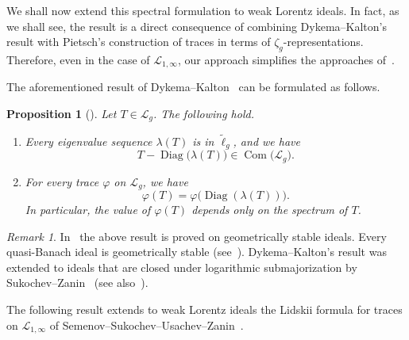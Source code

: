 \documentclass[10pt, a4paper]{amsart}
\newcommand{\sL}{\mathscr{L}}
\newcommand{\op}{\operatorname}
\newcommand{\Com}{\op{Com}}
\numberwithin{equation}{section}
\newtheorem{proposition}[theorem]{Proposition}
\theoremstyle{definition}
\theoremstyle{remark}
\newtheorem{remark}[theorem]{Remark}
\newcommand{\Diag}{\op{Diag}}
\begin{document}
We shall now extend this spectral formulation to weak Lorentz ideals. In fact, as we shall see, the result is a direct consequence of combining Dykema--Kalton's result with Pietsch's construction of traces in terms of $\zeta_g$-representations. Therefore, even in the case of $\sL_{1,\infty}$, our approach simplifies the approaches of~\cite{LSZ:Book, SSUZ:AIM15}.
 
 The aforementioned result of Dykema--Kalton~\cite{DK:Crelle98} can be formulated as follows.

\begin{proposition}[\cite{DK:Crelle98}] \label{prop:DK}
Let $T\in \sL_g$. The following hold. 
\begin{enumerate}
 \item Every eigenvalue sequence $\lambda(T)$ is in $\tilde{\ell}_g$, and we have
 \begin{equation*}
 T- \Diag\big(\lambda(T)\big)\in \Com\big(\sL_g\big). 
\end{equation*}

\item For every trace $\varphi$ on $\sL_g$, we have
\begin{equation*}
 \varphi(T)=\varphi\big(\Diag( \lambda(T))\big).
\end{equation*}
In particular, the value of $\varphi(T)$ depends only on the spectrum of $T$.
\end{enumerate}
\end{proposition}

\begin{remark}
In~\cite{DK:Crelle98} the above result is proved on geometrically stable ideals. Every quasi-Banach ideal is geometrically stable (see~\cite{Ka:Crelle98}). Dykema--Kalton's result was extended to ideals that are closed under logarithmic submajorization by Sukochev--Zanin~\cite{SZ:AIM14} (see also~\cite[Chapter~5]{LSZ:Book}).
\end{remark}

The following result extends to weak Lorentz ideals the Lidskii formula for traces on $\sL_{1,\infty}$ of Semenov--Sukochev--Usachev--Zanin~\cite[Theorem~6.3]{SSUZ:AIM15}.
\end{document}

